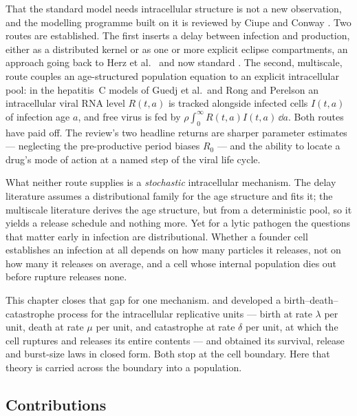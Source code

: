 That the standard model needs intracellular structure is not a new
observation, and the modelling programme built on it is reviewed by Ciupe and
Conway \cite{ciupe2024incorporating}. Two routes are established. The first
inserts a delay between infection and production, either as a distributed
kernel or as one or more explicit eclipse compartments, an approach going
back to Herz et al.\ \cite{herz1996viral} and now standard
\cite{mittler1998influence,dixit2004complex,kakizoe2015method}. The second,
multiscale, route couples an age-structured population equation to an
explicit intracellular pool: in the hepatitis~C models of Guedj et al.\ and
Rong and Perelson \cite{guedj2013modeling,rong2013mathematical} an
intracellular viral RNA level $R(t,a)$ is tracked alongside infected cells
$I(t,a)$ of infection age $a$, and free virus is fed by
$\rho\int_0^\infty R(t,a)I(t,a)\,\dd a$. Both routes have paid off. The
review's two headline returns are sharper parameter estimates --- neglecting
the pre-productive period biases $R_0$
\cite{lloyd2001dependence} --- and the ability to
locate a drug's mode of action at a named step of the viral life cycle.

What neither route supplies is a \emph{stochastic} intracellular mechanism.
The delay literature assumes a distributional family for the age structure
and fits it; the multiscale literature derives the age structure, but from a
deterministic pool, so it yields a release schedule and nothing more. Yet
for a lytic pathogen the questions that matter early in infection are
distributional. Whether a founder cell establishes an infection at all
depends on how many particles it releases, not on how many it releases on
average, and a cell whose internal population dies out before rupture
releases none.

This chapter closes that gap for one mechanism. \ChCorecap{} and \ChDist{}
developed a birth--death--catastrophe process for the intracellular
replicative units --- birth at rate $\lambda$ per unit, death at rate $\mu$
per unit, and catastrophe at rate $\delta$ per unit, at which the cell
ruptures and releases its entire contents --- and obtained its survival,
release and burst-size laws in closed form. Both stop at the cell boundary.
Here that theory is carried across the boundary into a population.

\subsection*{Contributions}


